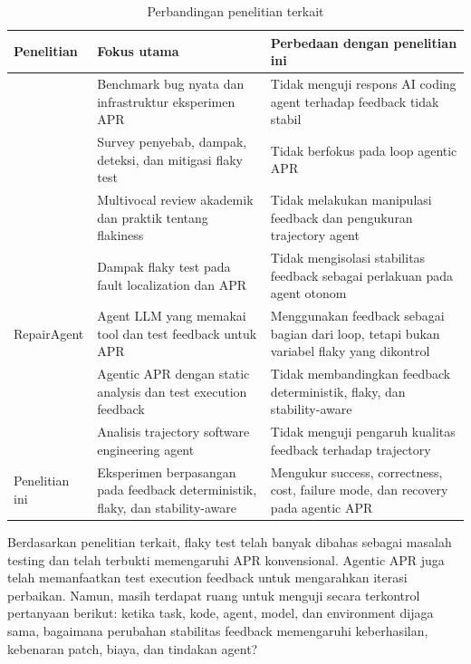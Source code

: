 \begin{table}[htbp]
\centering
\small
\renewcommand{\arraystretch}{1.25}
\caption{Perbandingan penelitian terkait}
\label{tab:related-work}
\begin{tabularx}{\textwidth}{p{3.1cm}YY}
\toprule
\textbf{Penelitian} & \textbf{Fokus utama} & \textbf{Perbedaan dengan penelitian ini} \\
\midrule
\citet{defects4j2014} & Benchmark bug nyata dan infrastruktur eksperimen APR & Tidak menguji respons AI coding agent terhadap feedback tidak stabil \\
\citet{parry2022flaky} & Survey penyebab, dampak, deteksi, dan mitigasi flaky test & Tidak berfokus pada loop agentic APR \\
\citet{tahir2023flakiness} & Multivocal review akademik dan praktik tentang flakiness & Tidak melakukan manipulasi feedback dan pengukuran trajectory agent \\
\citet{qin2021flaky} & Dampak flaky test pada fault localization dan APR & Tidak mengisolasi stabilitas feedback sebagai perlakuan pada agent otonom \\
RepairAgent \cite{repairagent2025} & Agent LLM yang memakai tool dan test feedback untuk APR & Menggunakan feedback sebagai bagian dari loop, tetapi bukan variabel flaky yang dikontrol \\
\citet{maddila2026} & Agentic APR dengan static analysis dan test execution feedback & Tidak membandingkan feedback deterministik, flaky, dan stability-aware \\
\citet{bouzenia2025trajectories} & Analisis trajectory software engineering agent & Tidak menguji pengaruh kualitas feedback terhadap trajectory \\
Penelitian ini & Eksperimen berpasangan pada feedback deterministik, flaky, dan stability-aware & Mengukur success, correctness, cost, failure mode, dan recovery pada agentic APR \\
\bottomrule
\end{tabularx}
\end{table}

Berdasarkan penelitian terkait, flaky test telah banyak dibahas sebagai masalah testing dan telah terbukti memengaruhi APR konvensional. Agentic APR juga telah memanfaatkan test execution feedback untuk mengarahkan iterasi perbaikan. Namun, masih terdapat ruang untuk menguji secara terkontrol pertanyaan berikut: ketika task, kode, agent, model, dan environment dijaga sama, bagaimana perubahan stabilitas feedback memengaruhi keberhasilan, kebenaran patch, biaya, dan tindakan agent?


